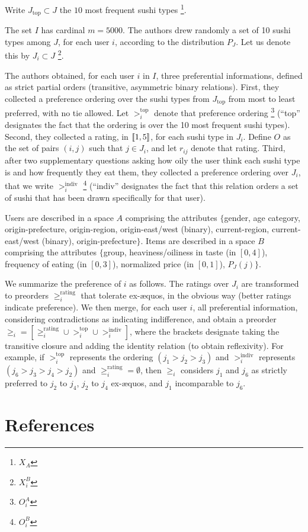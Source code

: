 \documentclass[version=last, pagesize, twoside=off, bibliography=totoc, DIV=calc, fontsize=14pt, a4paper, french, english]{scrartcl}
\begin{document}
Write $J_\text{top} \subset J$ the $10$ most frequent sushi types \footnote{$X_A$}.

The set $I$ has cardinal $m = 5000$. The authors drew randomly a set of 10 sushi types among $J$, for each user $i$, according to the distribution $P_J$. Let us denote this by $J_i \subset J$ \footnote{$X^B_i$}.

The authors obtained, for each user $i$ in $I$, three preferential informations, defined as strict partial orders (transitive, asymmetric binary relations). First, they collected a preference ordering over the sushi types from $J_\text{top}$ from most to least preferred, with no tie allowed. Let $>^\text{top}_i$ denote that preference ordering \footnote{$O^A_i$} (“top” designates the fact that the ordering is over the 10 most frequent sushi types). Second, they collected a rating, in $\lbrack\!\lbrack{}1, 5\rbrack\!\rbrack$, for each sushi type in $J_i$. Define $O$ as the set of pairs $(i, j)$ such that $j \in J_i$, and let $r_{ij}$ denote that rating. Third, after two supplementary questions asking how oily the user think each sushi type is and how frequently they eat them, they collected a preference ordering over $J_i$, that we write $>^\text{indiv}_i$ \footnote{$O^B_i$} (“indiv” designates the fact that this relation orders a set of sushi that has been drawn specifically for that user).

Users are described in a space $A$ comprising the attributes $\{$gender, age category, origin-prefecture, origin-region, origin-east/west (binary), current-region, current-east/west (binary), origin-prefecture$\}$. Items are described in a space $B$ comprising the attributes $\{$group, heaviness/oiliness in taste (in $[0, 4]$), frequency of eating (in $[0, 3]$), normalized price (in $[0, 1]$), $P_J(j)$$\}$.

We summarize the preference of $i$ as follows. The ratings over $J_i$ are transformed to preorders $≥^\text{rating}_i$ that tolerate ex-æquos, in the obvious way (better ratings indicate preference). We then merge, for each user $i$, all preferential information, considering contradictions as indicating indifference, and obtain a preorder $≥_i = [≥^\text{rating}_i ∪ >^\text{top}_i ∪ >^\text{indiv}_i]$, where the brackets designate taking the transitive closure and adding the identity relation (to obtain reflexivity). For example, if $>^\text{top}_i$ represents the ordering $(j_1 > j_2 > j_3)$ and $>^\text{indiv}_i$ represents $(j_6 > j_3 > j_4 > j_2)$ and $≥^\text{rating}_i = \emptyset$, then $≥_i$ considers $j_1$ and $j_6$ as strictly preferred to $j_2$ to $j_4$, $j_2$ to $j_4$ ex-æquos, and $j_1$ incomparable to $j_6$.

\section{References}

\end{document}
